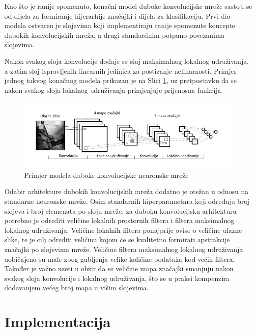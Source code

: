 \documentclass[lmodern, utf8, diplomski, numeric]{fer}
\begin{document}
Kao što je ranije spomenuto, konačni model duboke konvolucijske mreže sastoji se od dijela za formiranje hijerarhije značajki i dijela za klasifikaciju. Prvi dio modela ostvaren je slojevima koji implementiraju ranije spomenute koncepte dubokih konvolucijskih mreža, a drugi standardnim potpuno povezanima slojevima. 

Nakon svakog sloja konvolucije dodaje se sloj maksimalnog lokalnog udruživanja, a zatim sloj ispravljenih linearnih jedinica za postizanje nelinarnosti. Primjer jednog takvog konačnog modela prikazan je na Slici \ref{fig:cnnmodel}, uz pretpostavku da se nakon svakog sloja lokalnog udruživanja primjenjuje prijenosna funkcija.

\begin{figure}[ht!]
\centering
\includegraphics[width=15cm]{slike/convnet.jpg}
\caption{Primjer modela duboke konvolucijske neuronske mreže}
\label{fig:cnnmodel}
\end{figure}

Odabir arhitekture dubokih konvolucijskih mreža dodatno je otežan u odnosu na standarne neuronske mreže. Osim standarnih hiperparametara koji određuju broj slojeva i broj elemenata po sloju mreže, za duboku konvolucijsku arhitekturu potrebno je odrediti veličine lokalnih prostornih filtera i filtera maksimalnog lokalnog udruživanja. Veličine lokalnih filtera ponajprije ovise o veličine ulazne slike, te je cilj odrediti veličinu kojom će se kvalitetno formirati apstrakcije značajki po slojevima mreže. Veličine filtera maksimalnog lokalnog udruživanja uobičajeno su male zbog gubljenja velike količine podataka kod većih filtera. Također je važno uzeti u obzir da se veličine mapa značajki smanjuju nakon svakog sloja konvolucije i lokalnog udruživanja, što se u praksi kompenzira dodavanjem većeg broj mapa u višim slojevima.



\chapter{Implementacija}
\end{document}
